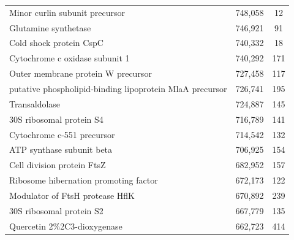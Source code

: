 \begin{singlespace}
\begin{longtable}{p{} cc}
                                                            Minor curlin subunit precursor &                     748,058 &            12 \\
                                                                      Glutamine synthetase &                     746,921 &            91 \\
                                                                   Cold shock protein CspC &                     740,332 &            18 \\
                                                            Cytochrome c oxidase subunit 1 &                     740,292 &           171 \\
                                                        Outer membrane protein W precursor &                     727,458 &           117 \\
                                  putative phospholipid-binding lipoprotein MlaA precursor &                     726,741 &           195 \\
                                                                             Transaldolase &                     724,887 &           145 \\
                                                                  30S ribosomal protein S4 &                     716,789 &           141 \\
                                                                Cytochrome c-551 precursor &                     714,542 &           132 \\
                                                                 ATP synthase subunit beta &                     706,925 &           154 \\
                                                                Cell division protein FtsZ &                     682,952 &           157 \\
                                                     Ribosome hibernation promoting factor &                     672,173 &           122 \\
                                                           Modulator of FtsH protease HflK &                     670,892 &           239 \\
                                                                  30S ribosomal protein S2 &                     667,779 &           135 \\
                                                               Quercetin 2\%2C3-dioxygenase &                     662,723 &           414 \\

\end{longtable}
\end{singlespace}

